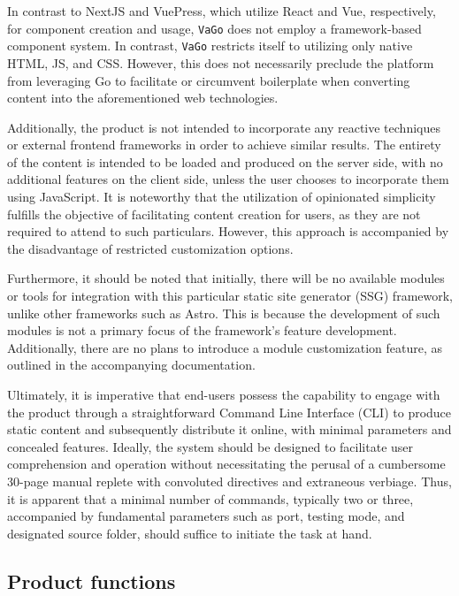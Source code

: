 In contrast to NextJS and VuePress\cite{vuepress}, which utilize React and Vue,
respectively, for component creation and usage, \texttt{VaGo} does not
employ a framework-based component system. In contrast, \texttt{VaGo}
restricts itself to utilizing only native HTML, JS, and CSS. However,
this does not necessarily preclude the platform from leveraging Go to
facilitate or circumvent boilerplate when converting content into the
aforementioned web technologies.

Additionally, the product is not intended to incorporate any reactive
techniques or external frontend frameworks in order to achieve similar
results. The entirety of the content is intended to be loaded and
produced on the server side\cite{sunssr}, with no additional features on the client
side, unless the user chooses to incorporate them using JavaScript. It
is noteworthy that the utilization of opinionated simplicity fulfills
the objective of facilitating content creation for users, as they are
not required to attend to such particulars. However, this approach is
accompanied by the disadvantage of restricted customization options.

Furthermore, it should be noted that initially, there will be no
available modules or tools for integration with this particular static
site generator (SSG) framework, unlike other frameworks such as Astro.
This is because the development of such modules is not a primary focus
of the framework's feature development. Additionally, there are no plans
to introduce a module customization feature, as outlined in the
accompanying documentation.

Ultimately, it is imperative that end-users possess the capability to
engage with the product through a straightforward Command Line Interface
(CLI) to produce static content and subsequently distribute it online,
with minimal parameters and concealed features. Ideally, the system
should be designed to facilitate user comprehension and operation
without necessitating the perusal of a cumbersome 30-page manual replete
with convoluted directives and extraneous verbiage. Thus, it is apparent
that a minimal number of commands, typically two or three, accompanied
by fundamental parameters such as port, testing mode, and designated
source folder, should suffice to initiate the task at hand.

\subsection{Product functions}\label{subsubsec:product-functions}

